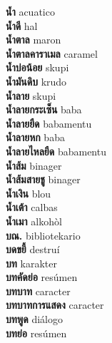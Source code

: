 \textbf{ น้ำ  } acuatico \\
\textbf{ น้ำดี  } hal \\
\textbf{ น้ำตาล  } maron \\
\textbf{ น้ำตาลคาราเมล  } caramel \\
\textbf{ น้ำบ่อน้อย  } skupi \\
\textbf{ น้ำมันดิบ  } krudo \\
\textbf{ น้ำลาย  } skupi \\
\textbf{ น้ำลายกระเซ็น  } baba \\
\textbf{ น้ำลายยืด  } babamentu \\
\textbf{ น้ำลายหก  } baba \\
\textbf{ น้ำลายไหลยืด  } babamentu \\
\textbf{ น้ำส้ม  } binager \\
\textbf{ น้ำส้มสายชู  } binager \\
\textbf{ น้ำเงิน  } blou \\
\textbf{ น้ำเต้า  } calbas \\
\textbf{ น้ำเมา  } alkohòl \\
\textbf{ บณ.  } bibliotekario \\
\textbf{ บดขยี้  } destruí \\
\textbf{ บท  } karakter \\
\textbf{ บทคัดย่อ  } resúmen \\
\textbf{ บทบาท  } caracter \\
\textbf{ บทบาทการแสดง  } caracter \\
\textbf{ บทพูด  } diálogo \\
\textbf{ บทย่อ  } resúmen \\
